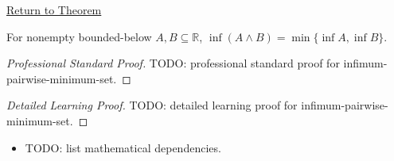 \newpage
{}
\label{prf:infimum-pairwise-minimum-set}

\begin{remark*}[Return]
\hyperref[thm:infimum-pairwise-minimum-set]{Return to Theorem}
\end{remark*}

\begin{theorem*}
For nonempty bounded-below $A,B\subseteq\mathbb{R}$,
$\inf(A\wedge B)=\min\{\inf A,\inf B\}$.
\end{theorem*}

\begin{proof}[Professional Standard Proof]
\LRAProofBodyStart
TODO: professional standard proof for infimum-pairwise-minimum-set.
\end{proof}

\begin{proof}[Detailed Learning Proof]
\LRAProofBodyStart
TODO: detailed learning proof for infimum-pairwise-minimum-set.
\end{proof}

\begin{remark*}
\end{remark*}

\begin{dependencies}
\begin{itemize}
  \item TODO: list mathematical dependencies.
\end{itemize}
\end{dependencies}

\clearpage
